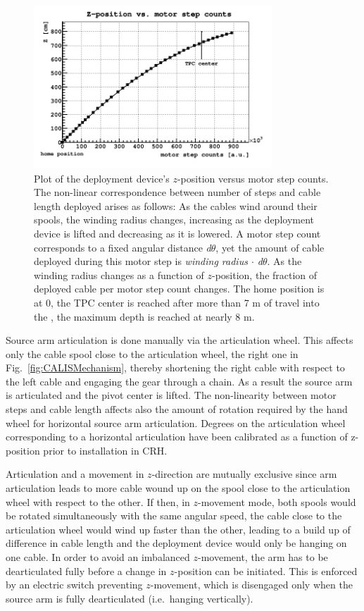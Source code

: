 \begin{figure}[htbp]
 \centering
 \includegraphics[width=0.8\textwidth]{Figures/MSC_Z}
 \caption{Plot of the deployment device's $z$-position versus motor step counts. The non-linear correspondence between number of steps and cable length deployed arises as follows: As the cables wind around their spools, the winding radius changes, increasing as the deployment device is lifted and decreasing as it is lowered. A motor step count corresponds to a fixed angular distance \textit{d$\theta$}, yet the amount of cable deployed during this motor step is \textit{winding radius $\cdot$ d$\theta$}. As the winding radius changes as a function of $z$-position, the fraction of deployed cable per motor step count changes. The home position is at 0, the TPC center is reached after more than 7 m of travel into the \lsv, the maximum depth is reached at nearly 8 m.}
 \label{fig:z_test}
\end{figure}


Source arm articulation is done manually via the articulation wheel. This affects only the cable spool close to the articulation wheel, the right one in Fig.~\ref{fig:CALISMechanism}, thereby shortening the right cable with respect to the left cable and engaging the gear through a chain. As a result the source arm is articulated and the pivot center is lifted. The non-linearity between motor steps and cable length affects also the amount of rotation required by the hand wheel for horizontal source arm articulation. Degrees on the articulation wheel corresponding to a horizontal articulation have been calibrated as a function of z-position prior to installation in CRH.

Articulation and a movement in $z$-direction are mutually exclusive since arm articulation leads to more cable wound up on the spool close to the articulation wheel with respect to the other. If then, in $z$-movement mode, both spools would be rotated simultaneously with the same angular speed, the cable close to the articulation wheel would wind up faster than the other, leading to a build up of difference in cable length and the deployment device would only be hanging on one cable. In order to avoid an imbalanced $z$-movement, the arm has to be dearticulated fully before a change in $z$-position can be initiated. This is enforced by an electric switch preventing $z$-movement, which is disengaged only when the source arm is fully dearticulated (i.e.~hanging vertically). 

